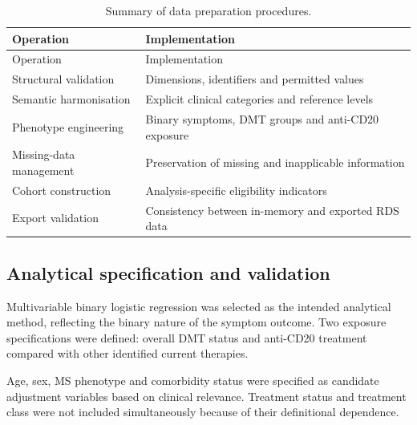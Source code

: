 \documentclass[
  british,
]{article}
\begin{document}
\begin{longtable}[]{@{}
  >{\raggedright\arraybackslash}p{}
  >{\raggedright\arraybackslash}p{}@{}}
\caption{Summary of data preparation procedures.}\tabularnewline
\toprule\noalign{}
\begin{minipage}[b]{\linewidth}\raggedright
Operation
\end{minipage} & \begin{minipage}[b]{\linewidth}\raggedright
Implementation
\end{minipage} \\
\midrule\noalign{}
\endfirsthead
\toprule\noalign{}
\begin{minipage}[b]{\linewidth}\raggedright
Operation
\end{minipage} & \begin{minipage}[b]{\linewidth}\raggedright
Implementation
\end{minipage} \\
\midrule\noalign{}
\endhead
\bottomrule\noalign{}
\endlastfoot
Structural validation & Dimensions, identifiers and permitted values \\
Semantic harmonisation & Explicit clinical categories and reference
levels \\
Phenotype engineering & Binary symptoms, DMT groups and anti-CD20
exposure \\
Missing-data management & Preservation of missing and inapplicable
information \\
Cohort construction & Analysis-specific eligibility indicators \\
Export validation & Consistency between in-memory and exported RDS
data \\
\end{longtable}

\subsection{Analytical specification and
validation}\label{analytical-specification-and-validation}

Multivariable binary logistic regression was selected as the intended
analytical method, reflecting the binary nature of the symptom outcome.
Two exposure specifications were defined: overall DMT status and
anti-CD20 treatment compared with other identified current therapies.

Age, sex, MS phenotype and comorbidity status were specified as
candidate adjustment variables based on clinical relevance. Treatment
status and treatment class were not included simultaneously because of
their definitional dependence.
\end{document}
